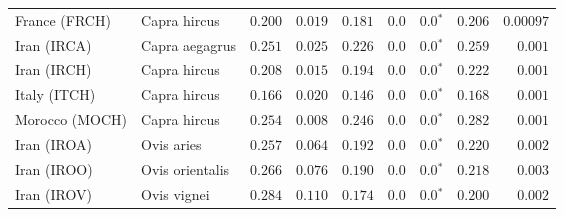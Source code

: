 \begin{center}
\begin{adjustbox}{width = 1\textwidth}
\begin{tabular}{|l|l|r|r|r|r|r|r|r|}
                  France (FRCH) &         Capra hircus &                                        $ 0.200$ &                                           $ 0.019$ &                      $ 0.181$ &            $0.0$ &                  $\bm{0.0{^*}}$ &                                           $ 0.206$ &          $0.00097$ \\
                    Iran (IRCA) &       Capra aegagrus &                                        $ 0.251$ &                                           $ 0.025$ &                      $ 0.226$ &            $0.0$ &                  $\bm{0.0{^*}}$ &                                           $ 0.259$ &           $ 0.001$ \\
                    Iran (IRCH) &         Capra hircus &                                        $ 0.208$ &                                           $ 0.015$ &                      $ 0.194$ &            $0.0$ &                  $\bm{0.0{^*}}$ &                                           $ 0.222$ &           $ 0.001$ \\
                   Italy (ITCH) &         Capra hircus &                                        $ 0.166$ &                                           $ 0.020$ &                      $ 0.146$ &            $0.0$ &                  $\bm{0.0{^*}}$ &                                           $ 0.168$ &           $ 0.001$ \\
                 Morocco (MOCH) &         Capra hircus &                                        $ 0.254$ &                                           $ 0.008$ &                      $ 0.246$ &            $0.0$ &                  $\bm{0.0{^*}}$ &                                           $ 0.282$ &           $ 0.001$ \\
                    Iran (IROA) &           Ovis aries &                                        $ 0.257$ &                                           $ 0.064$ &                      $ 0.192$ &            $0.0$ &                  $\bm{0.0{^*}}$ &                                           $ 0.220$ &           $ 0.002$ \\
                    Iran (IROO) &      Ovis orientalis &                                        $ 0.266$ &                                           $ 0.076$ &                      $ 0.190$ &            $0.0$ &                  $\bm{0.0{^*}}$ &                                           $ 0.218$ &           $ 0.003$ \\
                    Iran (IROV) &          Ovis vignei &                                        $ 0.284$ &                                           $ 0.110$ &                      $ 0.174$ &            $0.0$ &                  $\bm{0.0{^*}}$ &                                           $ 0.200$ &           $ 0.002$ \\

\end{tabular}
\end{adjustbox}
\end{center}
